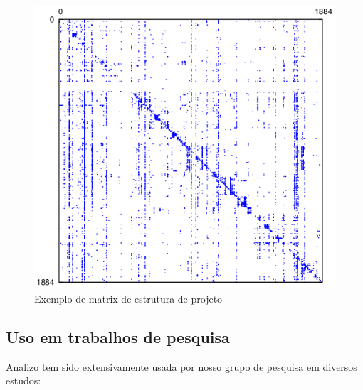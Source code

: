 \begin{figure}[h]
\center
\includegraphics[scale=0.3]{imagens/sample-dsm.png}
\caption{Exemplo de matrix de estrutura de projeto}
\label{sample-dsm}
\end{figure}

\subsection{Uso em trabalhos de pesquisa}
\label{trabalhos-analizo}

Analizo tem sido extensivamente usada por nosso grupo de pesquisa em diversos
estudos:

